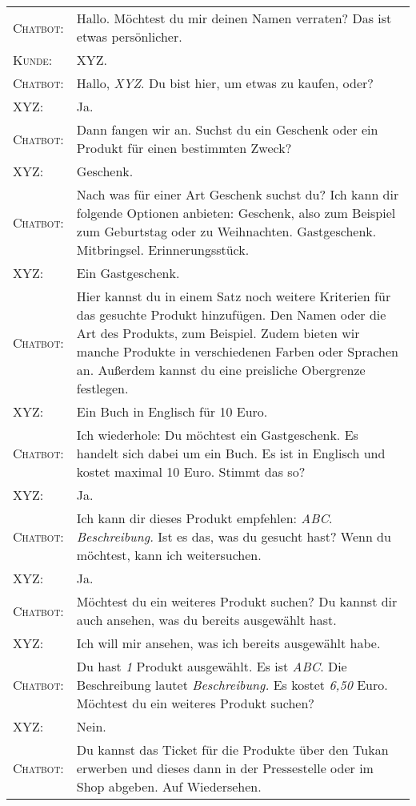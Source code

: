 \begin{center}
\begin{tabular}{p{}p{}}
	\textsc{Chatbot:} & Hallo. Möchtest du mir deinen Namen verraten? Das ist etwas persönlicher. \\
	\textsc{Kunde:} & XYZ.\\
	\textsc{Chatbot:} & Hallo, \textit{XYZ}. Du bist hier, um etwas zu kaufen, oder? \\
	\textsc{XYZ:} & Ja. \\
	\textsc{Chatbot:} & Dann fangen wir an. Suchst du ein Geschenk oder ein Produkt für einen bestimmten Zweck? \\
	\textsc{XYZ:} & Geschenk.\\
	\textsc{Chatbot:} & Nach was für einer Art Geschenk suchst du? Ich kann dir folgende Optionen anbieten: Geschenk, also zum Beispiel zum Geburtstag oder zu Weihnachten. Gastgeschenk. Mitbringsel. Erinnerungsstück.\\
	\textsc{XYZ:} & Ein Gastgeschenk. \\
	\textsc{Chatbot:} & Hier kannst du in einem Satz noch weitere Kriterien für das gesuchte Produkt hinzufügen. Den Namen oder die Art des Produkts, zum Beispiel. Zudem bieten wir manche Produkte in verschiedenen Farben oder Sprachen an. Außerdem kannst du eine preisliche Obergrenze festlegen.\\
	\textsc{XYZ:} & Ein Buch in Englisch für 10 Euro.\\
	\textsc{Chatbot:} & Ich wiederhole: Du möchtest ein Gastgeschenk. Es handelt sich dabei um ein Buch. Es ist in Englisch und kostet maximal 10 Euro. Stimmt das so? \\
	\textsc{XYZ:} & Ja. \\
	\textsc{Chatbot:} & Ich kann dir dieses Produkt empfehlen: \textit{ABC}. \textit{Beschreibung.} Ist es das, was du gesucht hast? Wenn du möchtest, kann ich weitersuchen. \\
	\textsc{XYZ:} & Ja. \\
	\textsc{Chatbot:} & Möchtest du ein weiteres Produkt suchen? Du kannst dir auch ansehen, was du bereits ausgewählt hast. \\
	\textsc{XYZ:} & Ich will mir ansehen, was ich bereits ausgewählt habe. \\
	\textsc{Chatbot:} & Du hast \textit{1} Produkt ausgewählt. Es ist \textit{ABC}. Die Beschreibung lautet \textit{Beschreibung.} Es kostet \textit{6,50} Euro. Möchtest du ein weiteres Produkt suchen? \\
	\textsc{XYZ:} & Nein.\\
	\textsc{Chatbot:} & Du kannst das Ticket für die Produkte über den Tukan erwerben und dieses dann in der Pressestelle oder im Shop abgeben. Auf Wiedersehen.\\
	\end{tabular}
\end{center}
\vspace{12pt}


